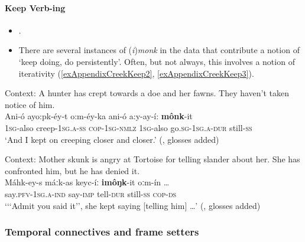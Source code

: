\paragraph{Keep Verb-ing}\label{appendixCreekKeep}
\begin{itemize}
	\item \textcite[306–307]{Martin2011}.
	\item There are several instances of \mbox{(\textit{i})\textit{monk}} in the data that contribute a notion of \lq keep doing, do persistently\rq{}. Often, but not always, this involves a notion of iterativity (\ref{exAppendixCreekKeep2}, \ref{exAppendixCreekKeep3}). 
\end{itemize}
\begin{exe}
	
	\ex Context: A hunter has crept towards a doe and her fawns. They haven’t taken notice of him\label{exAppendixCreekKeep2}.\\
	\gll Ani-ó ayo:pk-éy-t 	o:m-éy-ka ani-ó a:y-ay-í: \textbf{mônk}-it\\
	1\textsc{sg}-also creep-1\textsc{sg}.\textsc{a}-\textsc{ss} \textsc{cop}-1\textsc{sg}-\textsc{nmlz} 1\textsc{sg}-also go.\textsc{sg}-1\textsc{sg.a}-\textsc{dur} still-\textsc{ss}\\
	\glt \lq And I kept on creeping closer and closer.\rq{ }(\cite[106]{Gouge2004}, glosses added)
	
	\ex Context: Mother skunk is angry at Tortoise for telling slander about her. She has confronted him, but he has denied it.\label{exAppendixCreekKeep3}\\
	\gll Máhk-ey-s máːk-as keyc-íː \textbf{imôŋk}-it oːm-ín …\\
	say.\textsc{pfv}-1\textsc{sg.a}-\textsc{ind} say-\textsc{imp} tell-\textsc{dur} still-\textsc{ss} \textsc{cop}-\textsc{ds}\\
\glt \lq {\lq\lq}Admit you said it\rq\rq{}, she kept saying [telling him] …\rq{ }(\cite[374]{HaasHill2014}, glosses added)
\end{exe}




\subsubsection{Temporal connectives and frame setters}
\largerpage[2]
